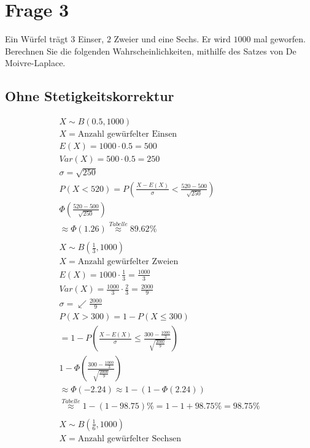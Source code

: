 \section{Frage 3}

Ein Würfel trägt $3$ Einser, $2$ Zweier und eine Sechs. Er wird $1000$ mal geworfen. Berechnen Sie die folgenden Wahrscheinlichkeiten, mithilfe des Satzes von De Moivre-Laplace.

\subsection{Ohne Stetigkeitskorrektur}

\begin{align*}
    X \sim B(0.5, 1000) \\
    X = \text{Anzahl gewürfelter Einsen} \\
    E(X) = 1000 \cdot 0.5 = 500 \\
    Var(X) = 500 \cdot 0.5 = 250 \\
    \sigma = \sqrt{250} \\
    P(X < 520) = P\left(\frac{X - E(X)}{\sigma} < \frac{520 - 500}{\sqrt{250}}\right) \\
    \Phi\left(\frac{520 - 500}{\sqrt{250}}\right) \\
    \approx \Phi(1.26) \overset{Tabelle}{\approx} 89.62\%\\\\
    X \sim B(\frac{1}{3}, 1000) \\
    X = \text{Anzahl gewürfelter Zweien} \\
    E(X) = 1000 \cdot \frac{1}{3} = \frac{1000}{3} \\
    Var(X) = \frac{1000}{3} \cdot \frac{2}{3} = \frac{2000}{9} \\
    \sigma = \swarrow\frac{2000}{9} \\
    P(X > 300) = 1 - P(X \leq 300) \\
    = 1 - P\left(\frac{X - E(X)}{\sigma} \leq \frac{300 - \frac{1000}{3}}{\sqrt{\frac{2000}{9}}}\right) \\
    1 - \Phi\left(\frac{300 - \frac{1000}{3}}{\sqrt{\frac{2000}{9}}}\right) \\
    \approx \Phi(-2.24) \approx 1 - (1 - \Phi(2.24)) \\ 
    \overset{Tabelle}{\approx} 1 - (1 - 98.75)\% = 1 - 1 + 98.75\% = 98.75\%  \\\\
    X \sim B(\frac{1}{6}, 1000) \\
    X = \text{Anzahl gewürfelter Sechsen} \\

\end{align*}
